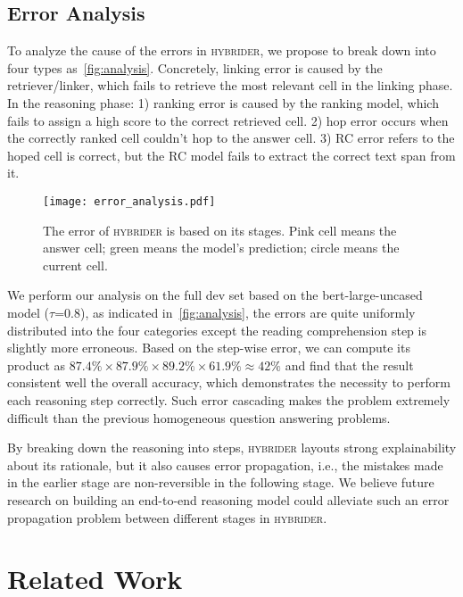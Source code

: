 \documentclass[11pt,a4paper]{article}
\newcommand{\model}{\textsc{hybrider}\xspace}
\begin{document}
\subsection{Error Analysis}
To analyze the cause of the errors in \model, we propose to break down into four types as~\autoref{fig:analysis}. Concretely, linking error is caused by the retriever/linker, which fails to retrieve the most relevant cell in the linking phase. In the reasoning phase: 1) ranking error is caused by the ranking model, which fails to assign a high score to the correct retrieved cell. 2) hop error occurs when the correctly ranked cell couldn't hop to the answer cell. 3) RC error refers to the hoped cell is correct, but the RC model fails to extract the correct text span from it.
\begin{figure}[!ht]
    \centering
    \texttt{[image: error\_analysis.pdf]}
    \caption{The error of \model is based on its stages. Pink cell means the answer cell; green means the model's prediction; circle means the current cell.}
    \label{fig:analysis}
    \vspace{-1ex}
\end{figure}
We perform our analysis on the full dev set based on the bert-large-uncased model ($\tau$=0.8), as indicated in~\autoref{fig:analysis}, the errors are quite uniformly distributed into the four categories except the reading comprehension step is slightly more erroneous. Based on the step-wise error, we can compute its product as $87.4\% \times 87.9\% \times 89.2\% \times 61.9\% \approx 42\%$ and find that the result consistent well the overall accuracy, which demonstrates the necessity to perform each reasoning step correctly. Such error cascading makes the problem extremely difficult than the previous homogeneous question answering problems. 

By breaking down the reasoning into steps, \model layouts strong explainability about its rationale, but it also causes error propagation, i.e., the mistakes made in the earlier stage are non-reversible in the following stage. We believe future research on building an end-to-end reasoning model could alleviate such an error propagation problem between different stages in \model.   

\section{Related Work}
\end{document}
